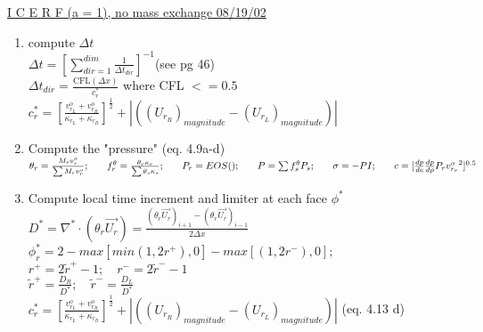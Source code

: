 \documentclass[fleqn]{article}
\newcommand{\delt}          {\ensuremath{\Delta{t}} }
\newcommand{\delx}          {\ensuremath{\Delta{x}} }
\newcommand{\f}             {\ensuremath{f^{\theta}_r} }
\newcommand{\sv}[1]         {\ensuremath{v^o_{r_{#1}} }}
\begin{document}
\setlength{\abovedisplayskip}{0.01in}
\setlength{\abovedisplayshortskip}{0.01in}
\setlength{\belowdisplayskip}{0.01in}
\setlength{\belowdisplayshortskip}{0.01in}
\setlength{\topsep}{0.01in}
\setlength{\mathindent}{0.01in}
\underline{I C E R F \quad  (a = 1), no mass exchange \hspace{ 0.5in}08/19/02}

\begin{enumerate}


\item compute $\delt$\\
  $ \delt = [ \sum_{dir=1}^{dim}\frac{1}{\delt_{dir}} ]^{-1}  $\hspace{0.5in}(see pg 46)\\
  $ \delt_{dir} = \frac{\text{CFL}(\delx)}{c^*_r} $\hspace {0.5in} where CFL $<= 0.5$\\
  $  c^*_r 
   = [\frac{ \sv{L} + \sv{R} }{\kappa_{r_L} + \kappa_{r_R}}]^{\frac{1}{2}} 
   + |((U_{r_R})_{magnitude} - (U_{r_L})_{magnitude})| $
\item Compute the "pressure"  (eq. 4.9a-d)\\
  $
    \theta_r = \frac{M_r \sv{} }{\sum{M_r \sv{} }}; \hspace{0.25in}
    \f = \frac{\theta_r \kappa_r}{\sum{\theta_s \kappa_s}};\hspace{0.25in}
    P_r = EOS(); \hspace{0.25in}
    P = \sum{f^{\theta}_s P_s}; \hspace{0.25in}
    \sigma = -PI; \hspace{0.25in}
    c = [\frac{dp}{de}\frac{dp}{d\rho} P_r {\sv{r}}^2]^{0.5}
  $
\item Compute local time increment and limiter at each face $\phi^*$\\
   $D^* = \nabla^* \cdot { (\theta_r \vec{U_r} )} = \frac{ (\theta_r\vec{U_r})_{i+1} - (\theta_r\vec{U_r})_{i-1}}{2\delx}$  \\
   $\phi^*_r = 2 - max[min(1,2r^+),0]-max[(1,2r^-),0];$ \\
   $ r^+ = 2 \tilde r^{+} - 1;   \quad r^- = 2 \tilde r^{-} - 1$\\
   $ \tilde r^{+} = \frac{D_R}{D^*}; \quad  \tilde r^{-} = \frac{D_L}{D^*}$\\
   $ c^*_r 
   = [\frac{ \sv{L} + \sv{R} }{\kappa_{r_L} + \kappa_{r_R}}]^{\frac{1}{2}} 
   + |((U_{r_R})_{magnitude} - (U_{r_L})_{magnitude})| $   \hspace{0.5in}(eq. 4.13 d)\\

\end{enumerate}
\end{document}

